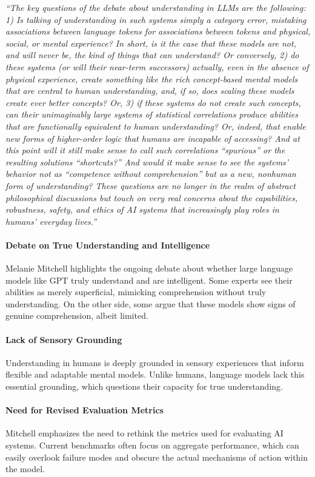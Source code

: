 \textit{``The key questions of the debate about understanding in LLMs are the following: 1) Is talking of understanding in such systems simply a category error, mistaking associations between language tokens for associations between tokens and physical, social, or mental experience? In short, is it the case that these models are not, and will never be, the kind of things that can understand? Or conversely, 2) do these systems (or will their near-term successors) actually, even in the absence of physical experience, create something like the rich concept-based mental models that are central to human understanding, and, if so, does scaling these models create ever better concepts? Or, 3) if these systems do not create such concepts, can their unimaginably large systems of statistical correlations produce abilities that are functionally equivalent to human understanding? Or, indeed, that enable new forms of higher-order logic that humans are incapable of accessing? And at this point will it still make sense to call such correlations “spurious” or the resulting solutions “shortcuts?” And would it make sense to see the systems’ behavior not as “competence without comprehension” but as a new, nonhuman form of understanding? These questions are no longer in the realm of abstract philosophical discussions but touch on very real concerns about the capabilities, robustness, safety, and ethics of AI systems that increasingly play roles in humans’ everyday lives.''}

\paragraph{Debate on True Understanding and Intelligence}
Melanie Mitchell highlights the ongoing debate about whether large language models like GPT truly understand and are intelligent. Some experts see their abilities as merely superficial, mimicking comprehension without truly understanding. On the other side, some argue that these models show signs of genuine comprehension, albeit limited.

\paragraph{Lack of Sensory Grounding}
Understanding in humans is deeply grounded in sensory experiences that inform flexible and adaptable mental models. Unlike humans, language models lack this essential grounding, which questions their capacity for true understanding.

\paragraph{Need for Revised Evaluation Metrics}
Mitchell emphasizes the need to rethink the metrics used for evaluating AI systems. Current benchmarks often focus on aggregate performance, which can easily overlook failure modes and obscure the actual mechanisms of action within the model.

